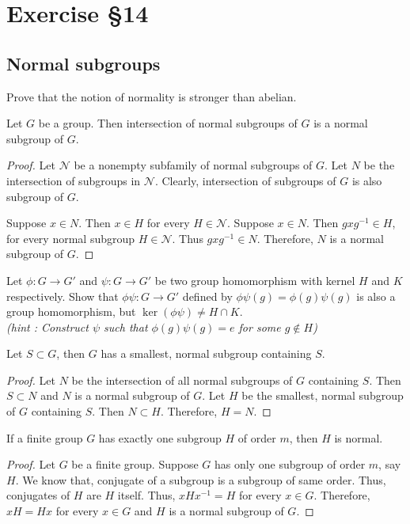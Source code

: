 \section{Exercise \S14}
\subsection{Normal subgroups}
\begin{question}
	Prove that the notion of normality is stronger than abelian. %
\end{question}

\begin{remark}
	Let $G$ be a group. Then intersection of normal subgroups of $G$ is a normal subgroup of $G$.%
\end{remark}
\begin{proof}
	Let $\mathcal{N}$ be a nonempty subfamily of normal subgroups of $G$. Let $N$ be the intersection of subgroups in $\mathcal{N}$. Clearly, intersection of subgroups of $G$ is also subgroup of $G$. 

	Suppose $x \in N$. Then $x \in H$ for every $H \in \mathcal{N}$. Suppose $x \in N$. Then $gxg^{-1} \in H$, for every normal subgroup $H \in \mathcal{N}$. Thus $gxg^{-1} \in N$. Therefore, $N$ is a normal subgroup of $G$.
\end{proof}

\begin{challenge}
	Let $\phi : G \to G'$ and $\psi : G \to G'$ be two group homomorphism with kernel $H$ and $K$ respectively. Show that $\phi\psi : G \to G'$ defined by $\phi\psi(g) = \phi(g)\psi(g)$ is also a group homomorphism, but $\ker(\phi\psi) \ne H \cap K$.\\
	\textit{(hint : Construct $\psi$ such that $\phi(g)\psi(g) = e$ for some $g \notin H$)}
\end{challenge}

\begin{remark}
	Let $S \subset G$, then $G$ has a smallest, normal subgroup containing $S$.%
	\end{remark}
\begin{proof}
	Let $N$ be the intersection of all normal subgroups of $G$ containing $S$. Then $S \subset N$ and $N$ is a normal subgroup of $G$. Let $H$ be the smallest, normal subgroup of $G$ containing $S$. Then $N \subset H$. Therefore, $H = N$.
\end{proof}

\begin{remark}
	If a finite group $G$ has exactly one subgroup $H$ of order $m$, then $H$ is normal.%
\end{remark}
\begin{proof}
	Let $G$ be a finite group. Suppose $G$ has only one subgroup of order $m$, say $H$. We know that, conjugate of a subgroup is a subgroup of same order. Thus, conjugates of $H$ are $H$ itself. Thus, $xHx^{-1} = H$ for every $x \in G$. Therefore, $xH = Hx$ for every $x \in G$ and $H$ is a normal subgroup of $G$.
\end{proof}

